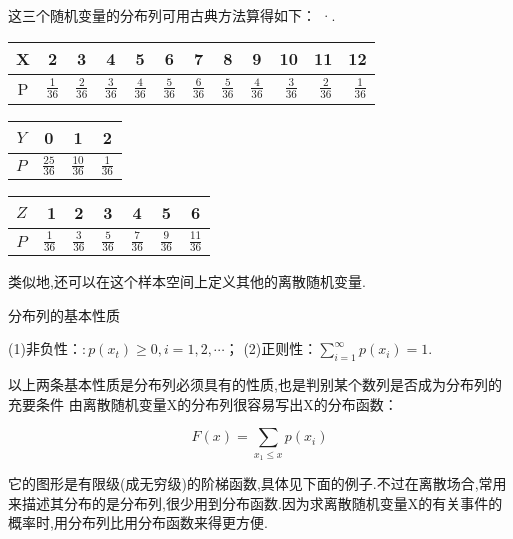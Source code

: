 这三个随机变量的分布列可用古典方法算得如下：
·.
\begin{table}[htbp]
	\centering
	\begin{tabular}{c|cccccrrrrrr}
		X     & 2     & 3     & 4     & 5     & 6     & \multicolumn{1}{c}{7} & \multicolumn{1}{c}{8} & \multicolumn{1}{c}{9} & \multicolumn{1}{c}{10} & \multicolumn{1}{c}{11} & \multicolumn{1}{c}{12} \\\hline
		P     &   $ \frac{1}{36} $    &   $ \frac{2}{36} $    &   $ \frac{3}{36} $    &   $ \frac{4}{36} $    &    $ \frac{5}{36} $   &   $ \frac{6}{36} $    &   $ \frac{5}{36} $    &    $ \frac{4}{36} $   &    $ \frac{3}{36} $   &    $ \frac{2}{36} $   &  $ \frac{1}{36} $\\
	\end{tabular}%
	
	\begin{tabular}{c|ccc}
		$ Y $     & 0     & 1     & 2 \\\hline
		$ P $     &  $ \frac{25}{36} $     &    $ \frac{10}{36} $   & $ \frac{1}{36} $ \\
	\end{tabular}%
	
	\begin{tabular}{c|rccccc}
		$ Z $     & 1 & 2     & 3     & 4     & 5     & 6 \\\hline
		$ P $     &   $ \frac{1}{36} $    &   $ \frac{3}{36} $    &   $ \frac{5}{36} $    &   $ \frac{7}{36} $    &   $ \frac{9}{36} $    &  $ \frac{11}{36} $\\
	\end{tabular}%
\end{table}%


类似地,还可以在这个样本空间上定义其他的离散随机变量.

分布列的基本性质


(1)非负性：$: p\left(x_{t}\right) \geqslant 0, i=1,2, \cdots$；
(2)正则性：$\sum_{i=1}^{\infty} p\left(x_{i}\right)=1$.

以上两条基本性质是分布列必须具有的性质,也是判别某个数列是否成为分布列的充要条件
由离散随机变量X的分布列很容易写出X的分布函数：

\[
F(x)=\sum_{x_{1} \leqslant x} p\left(x_{i}\right)
\]

它的图形是有限级(成无穷级)的阶梯函数,具体见下面的例子.不过在离散场合,常用来描述其分布的是分布列,很少用到分布函数.因为求离散随机变量X的有关事件的概率时,用分布列比用分布函数来得更方便.

